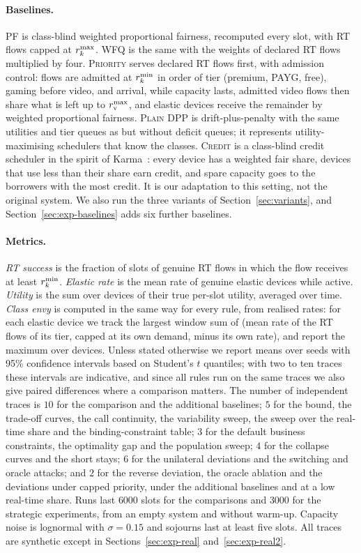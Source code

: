 \paragraph{Baselines.}
\textsc{PF} is class-blind weighted proportional fairness, recomputed every slot, with RT flows capped at $r^{\max}_k$.
\textsc{WFQ} is the same with the weights of declared RT flows multiplied by four.
\textsc{Priority} serves declared RT flows first, with admission control: flows are admitted at $r^{\min}_k$ in order of tier (premium, PAYG, free), gaming before video, and arrival, while capacity lasts, admitted video flows then share what is left up to $r^{\max}_{\mathrm{v}}$, and elastic devices receive the remainder by weighted proportional fairness.
\textsc{Plain DPP} is drift-plus-penalty with the same utilities and tier queues as \repay{} but without deficit queues; it represents utility-maximising schedulers that know the classes.
\textsc{Credit} is a class-blind credit scheduler in the spirit of Karma~\citep{vuppalapati2023karma}: every device has a weighted fair share, devices that use less than their share earn credit, and spare capacity goes to the borrowers with the most credit. It is our adaptation to this setting, not the original system.
We also run the three variants of Section~\ref{sec:variants}, and Section~\ref{sec:exp-baselines} adds six further baselines.

\paragraph{Metrics.}
\emph{RT success} is the fraction of slots of genuine RT flows in which the flow receives at least $r^{\min}_k$.
\emph{Elastic rate} is the mean rate of genuine elastic devices while active.
\emph{Utility} is the sum over devices of their true per-slot utility, averaged over time.
\emph{Class envy} is computed in the same way for every rule, from realised rates: for each elastic device we track the largest window sum of (mean rate of the RT flows of its tier, capped at its own demand, minus its own rate), and report the maximum over devices.
Unless stated otherwise we report means over seeds with 95\% confidence intervals based on Student's $t$ quantiles; with two to ten traces these intervals are indicative, and since all rules run on the same traces we also give paired differences where a comparison matters.
The number of independent traces is $10$ for the comparison and the additional baselines; $5$ for the bound, the trade-off curves, the call continuity, the variability sweep, the sweep over the real-time share and the binding-constraint table; $3$ for the default business constraints, the optimality gap and the population sweep; $4$ for the collapse curves and the short stays; $6$ for the unilateral deviations and the switching and oracle attacks; and $2$ for the reverse deviation, the oracle ablation and the deviations under capped priority, under the additional baselines and at a low real-time share. Runs last $6000$ slots for the comparisons and $3000$ for the strategic experiments, from an empty system and without warm-up.
Capacity noise is lognormal with $\sigma=0.15$ and sojourns last at least five slots. All traces are synthetic except in Sections~\ref{sec:exp-real} and~\ref{sec:exp-real2}.

